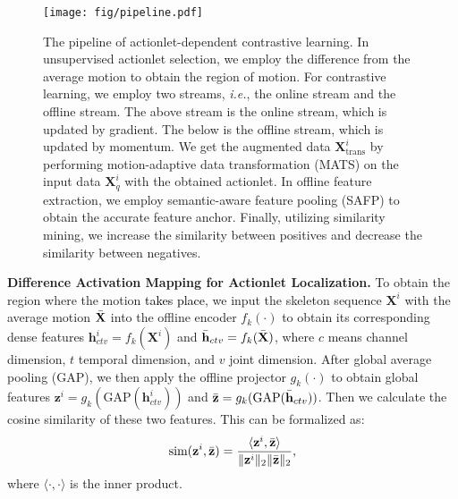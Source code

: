\documentclass[twocolumn]{article}
\newcommand{\wh}[1]{\textcolor{black}{#1}}
\begin{document}
\begin{figure*}[tb]
\begin{center}
\texttt{[image: fig/pipeline.pdf]}
\end{center}
\caption{
The pipeline of actionlet-dependent contrastive learning. In unsupervised actionlet selection, we employ the difference from the average motion to obtain the region of motion. For contrastive learning, we employ two streams, \textit{i.e.}, the online stream and the offline stream. The above stream is the online stream, which is updated by gradient. The below is the offline stream, which is updated by momentum. We get the augmented data $\mathbf{X}^i_{\text{trans}}$ by performing motion-adaptive data transformation (MATS) on the input data $\mathbf{X}^i_q$ with the obtained actionlet. In offline feature extraction, we employ semantic-aware feature pooling (SAFP) to obtain the accurate feature anchor. Finally, utilizing similarity mining, we increase the similarity between positives and decrease the similarity between negatives.
}
\label{fig:overview}
\end{figure*}

\noindent\textbf{Difference Activation Mapping for Actionlet Localization.}
To obtain the region where the motion \wh{takes place}, we input the skeleton sequence $\mathbf{X}^i$ with the average motion $\Bar{\mathbf{X}}$ into the offline encoder $f_k(\cdot)$ to obtain its corresponding dense features $\mathbf{h}^i_{ctv} = f_k(\mathbf{X}^i)$ and $\Bar{\mathbf{h}}_{ctv} = f_k(\Bar{\mathbf{X}})$, where $c$ means channel dimension, $t$ temporal dimension\wh{,} and $v$ joint dimension.
After global average pooling (GAP), we then apply the offline projector $g_k(\cdot)$ to obtain global features $\mathbf{z}^i = g_k(\text{GAP}(\mathbf{h}^i_{ctv}))$ and $\Bar{\mathbf{z}} = g_k(\text{GAP}(\Bar{\mathbf{h}}_{ctv}))$.
Then we calculate the cosine similarity of these two features. 
This can be formalized as:
\begin{equation}
    \label{equ:cos}
    \begin{aligned}
    \text{sim}(\mathbf{z}^i, \Bar{\mathbf{z}}) = \frac{\langle \mathbf{z}^i, \Bar{\mathbf{z}} \rangle}{\|\mathbf{z}^i\|_2\|\Bar{\mathbf{z}}\|_2},
    \end{aligned}
\end{equation}
where $\langle \cdot, \cdot \rangle$ is the inner product. 
\end{document}
